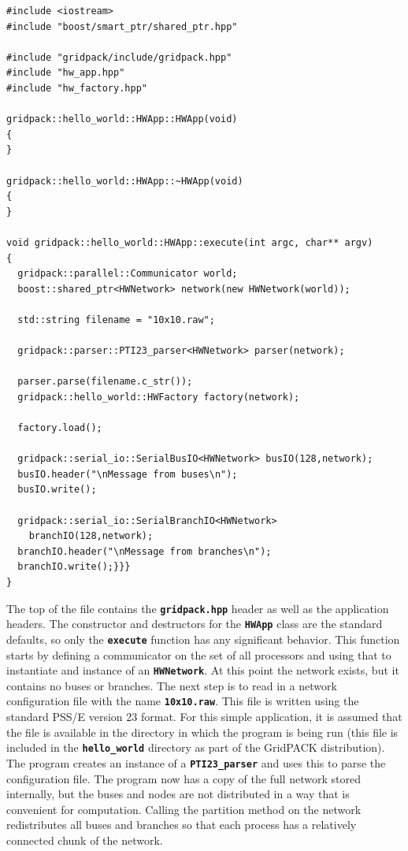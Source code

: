 \documentclass[12pt]{report} %
\begin{document}
{
\color{red}
\begin{Verbatim}[fontseries=b]
#include <iostream>
#include "boost/smart_ptr/shared_ptr.hpp"

#include "gridpack/include/gridpack.hpp"
#include "hw_app.hpp"
#include "hw_factory.hpp"

gridpack::hello_world::HWApp::HWApp(void)
{
}

gridpack::hello_world::HWApp::~HWApp(void)
{
}

void gridpack::hello_world::HWApp::execute(int argc, char** argv)
{
  gridpack::parallel::Communicator world;
  boost::shared_ptr<HWNetwork> network(new HWNetwork(world));

  std::string filename = "10x10.raw";

  gridpack::parser::PTI23_parser<HWNetwork> parser(network);

  parser.parse(filename.c_str());
  gridpack::hello_world::HWFactory factory(network);

  factory.load();

  gridpack::serial_io::SerialBusIO<HWNetwork> busIO(128,network);
  busIO.header("\nMessage from buses\n");
  busIO.write();

  gridpack::serial_io::SerialBranchIO<HWNetwork>
    branchIO(128,network);
  branchIO.header("\nMessage from branches\n");
  branchIO.write();}}}
}
\end{Verbatim}
}

The top of the file contains the \texttt{\textbf{gridpack.hpp}} header as well as the application headers. The constructor and destructors for the \texttt{\textbf{HWApp}} class are the standard defaults, so only the \texttt{\textbf{execute}} function has any significant behavior. This function starts by defining a communicator on the set of all processors and using that to instantiate and instance of an \texttt{\textbf{HWNetwork}}. At this point the network exists, but it contains no buses or branches. The next step is to read in a network configuration file with the name \texttt{\textbf{10x10.raw}}. This file is written using the standard PSS/E version 23 format. For this simple application, it is assumed that the file is available in the directory in which the program is being run (this file is included in the \texttt{\textbf{hello\_world}} directory as part of the GridPACK distribution). The program creates an instance of a \texttt{\textbf{PTI23\_parser}} and uses this to parse the configuration file. The program now has a copy of the full network stored internally, but the buses and nodes are not distributed in a way that is convenient for computation. Calling the partition method on the network redistributes all buses and branches so that each process has a relatively connected chunk of the network.
\end{document}
